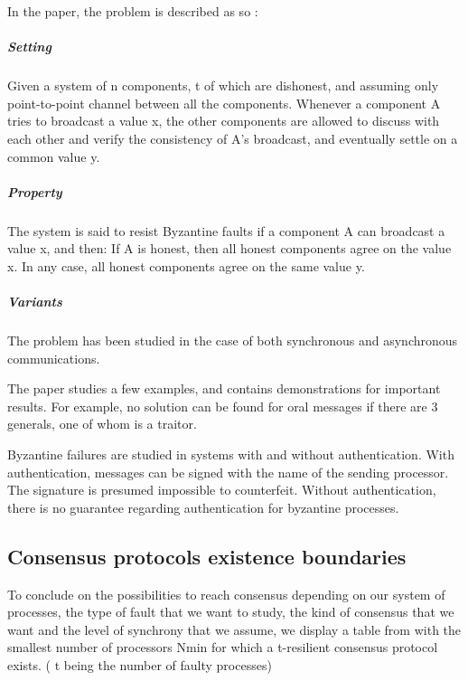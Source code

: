 \documentclass[11pt, twocolumn]{article}
\begin{document}
In the paper, the problem is described as so :
\subparagraph{Setting}
Given a system of n components, t of which are dishonest, and assuming only point-to-point channel between all the components.
Whenever a component A tries to broadcast a value x, the other components are allowed to discuss with each other and verify the consistency of A's broadcast, and eventually settle on a common value y.
\subparagraph{Property}
The system is said to resist Byzantine faults if a component A can broadcast a value x, and then:
If A is honest, then all honest components agree on the value x.
In any case, all honest components agree on the same value y.
\subparagraph{Variants}
The problem has been studied in the case of both synchronous and asynchronous communications.


The paper studies a few examples, and contains demonstrations for important results.  For example, no solution can be found for oral messages if there are 3 generals, one of whom is a traitor.

Byzantine failures are studied in systems with and without authentication. With authentication, messages can be signed with the name of the sending processor. The signature is presumed impossible to counterfeit. Without authentication, there is no guarantee regarding authentication for byzantine processes.

\subsection{Consensus protocols existence boundaries}

To conclude on the possibilities to reach consensus depending on our system of processes, the type of fault that we want to study, the kind of consensus that we want and the level of synchrony that we assume,
we display a table from \cite{partialSynchrony} with the smallest number of processors Nmin for which a t-resilient consensus protocol exists. ( t being the number of faulty processes)
\end{document}
